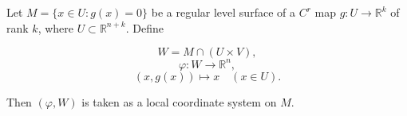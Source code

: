 Let $M = \{x \in U : g(x) = 0\}$ be a regular level surface of a $C^r$ map $g: U \to \mathbb{R}^k$ of rank $k$, where $U \subset \mathbb{R}^{n+k}$. Define

$$W = M \cap (U \times V),$$
$$\varphi: W \to \mathbb{R}^n,$$
$$(x, g(x)) \mapsto x \quad (x \in U).$$

Then $(\varphi, W)$ is taken as a local coordinate system on $M$.
